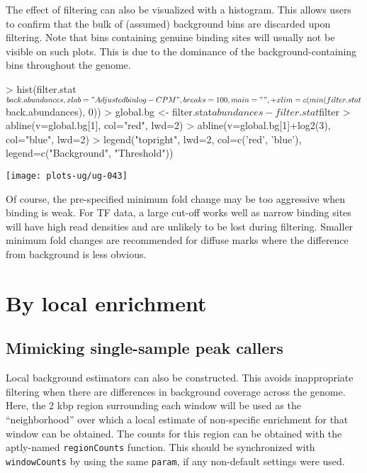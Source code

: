 \documentclass[12pt]{report}
\renewenvironment{Schunk}{\vspace{0pt}}{\vspace{0pt}}
\newcommand{\code}[1]{{\small\texttt{#1}}}
\begin{document}
The effect of filtering can also be visualized with a histogram. 
This allows users to confirm that the bulk of (assumed) background bins are discarded upon filtering. 
Note that bins containing genuine binding sites will usually not be visible on such plots.
This is due to the dominance of the background-containing bins throughout the genome.

\begin{Schunk}
\begin{Sinput}
> hist(filter.stat$back.abundances, xlab="Adjusted bin log-CPM", breaks=100, main="", 
+     xlim=c(min(filter.stat$back.abundances), 0))
> global.bg <- filter.stat$abundances - filter.stat$filter
> abline(v=global.bg[1], col="red", lwd=2)
> abline(v=global.bg[1]+log2(3), col="blue", lwd=2)
> legend("topright", lwd=2, col=c('red', 'blue'), legend=c("Background", "Threshold"))
\end{Sinput}
\end{Schunk}

\begin{center}
\texttt{[image: plots-ug/ug-043]}
\end{center}

Of course, the pre-specified minimum fold change may be too aggressive when binding is weak. 
For TF data, a large cut-off works well as narrow binding sites will have high read densities and are unlikely to be lost during filtering. 
Smaller minimum fold changes are recommended for diffuse marks where the difference from background is less obvious. 

\section{By local enrichment}

\subsection{Mimicking single-sample peak callers}
Local background estimators can also be constructed.
This avoids inappropriate filtering when there are differences in background coverage across the genome. 
Here, the 2 kbp region surrounding each window will be used as the ``neighborhood'' over which a local estimate of non-specific enrichment for that window can be obtained. 
The counts for this region can be obtained with the aptly-named \code{regionCounts} function.
This should be synchronized with \code{windowCounts} by using the same \code{param}, if any non-default settings were used.
\end{document}
